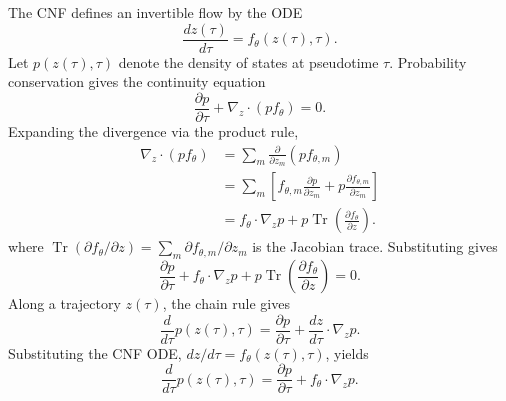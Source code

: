\documentclass[reprint,amsmath,amssymb,aps,pra,10pt]{revtex4-2}
\begin{document}
The CNF defines an invertible flow by the ODE \cite{chen2018,grathwohl2018}
\begin{equation}
    \frac{dz(\tau)}{d\tau}
    =
    f_\theta(z(\tau),\tau).
\end{equation}
Let $p(z(\tau),\tau)$ denote the density of states at pseudotime $\tau$.
Probability conservation gives the continuity equation
\begin{equation}
    \frac{\partial p}{\partial \tau}
    +
    \nabla_z \cdot
    \left(
        p f_\theta
    \right)
    =
    0.
\end{equation}
Expanding the divergence via the product rule,
\begin{equation}
    \begin{aligned}
        \nabla_z\cdot
        \left(
            p f_\theta
        \right)
        &=
        \sum_m
        \frac{\partial}
             {\partial z_m}
        \left(
            p f_{\theta,m}
        \right)
        \\
        &=
        \sum_m
        \left[
            f_{\theta,m}
            \frac{\partial p}{\partial z_m}
            +
            p
            \frac{\partial f_{\theta,m}}
                 {\partial z_m}
        \right]
        \\
        &=
        f_\theta\cdot\nabla_z p
        +
        p
        \operatorname{Tr}
        \left(
            \frac{\partial f_\theta}{\partial z}
        \right).
    \end{aligned}
\end{equation}
where $\operatorname{Tr}(\partial f_\theta/\partial z)=\sum_m \partial f_{\theta,m}/\partial z_m$ is the Jacobian trace.
Substituting gives
\begin{equation}
    \frac{\partial p}{\partial \tau}
    +
    f_\theta \cdot \nabla_z p
    +
    p
    \operatorname{Tr}
    \left(
        \frac{\partial f_\theta}{\partial z}
    \right)
    =
    0.
\end{equation}
Along a trajectory $z(\tau)$, the chain rule gives
\begin{equation}
    \frac{d}{d\tau}p(z(\tau),\tau)
    =
    \frac{\partial p}{\partial \tau}
    +
    \frac{dz}{d\tau}
    \cdot
    \nabla_z p.
\end{equation}
Substituting the CNF ODE, $dz/d\tau=f_\theta(z(\tau),\tau)$, yields
\begin{equation}
    \frac{d}{d\tau}p(z(\tau),\tau)
    =
    \frac{\partial p}{\partial \tau}
    +
    f_\theta
    \cdot
    \nabla_z p.
\end{equation}
\end{document}
